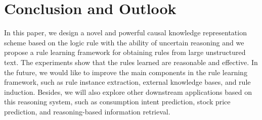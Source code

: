 


\section{Conclusion and Outlook}
\label{sec:conclusion}

In this paper, we design a novel and powerful causal knowledge representation scheme based on the logic rule with the ability of uncertain reasoning and we propose a rule learning framework for obtaining rules from large unstructured text. The experiments show that the rules learned are reasonable and effective.
In the future, we would like to improve the main components in the rule learning framework, such as rule instance extraction, external knowledge bases, and rule induction. Besides, we will also explore other downstream applications based on this reasoning system, such as consumption intent prediction, stock price prediction, and reasoning-based information retrieval.




